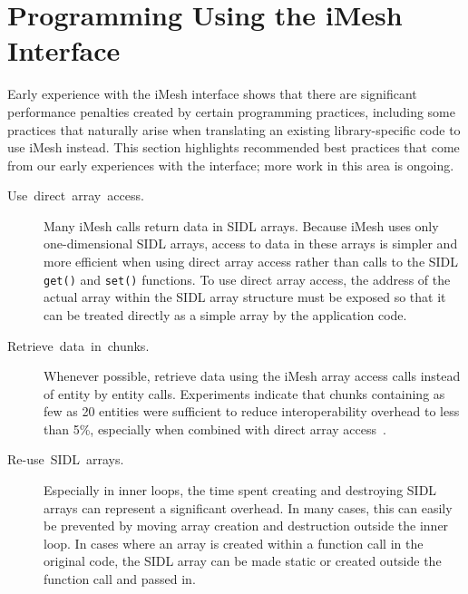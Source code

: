 
\section{Programming Using the iMesh Interface\label{sec:Programming}}

Early experience with the iMesh interface shows that there are
significant performance penalties created by certain programming
practices, including some practices that naturally arise when
translating an existing library-specific code to use iMesh instead. This
section highlights recommended best practices that come from our early
experiences with the interface; more work in this area is ongoing.

\begin{description}
\item [Use~direct~array~access.]Many iMesh calls return data in SIDL
arrays. Because iMesh uses only one-dimensional SIDL arrays, access to
data in these arrays is simpler and more efficient when using direct
array access rather than calls to the SIDL \texttt{get()} and
\texttt{set()} functions. To use direct array access, the address of the
actual array within the SIDL array structure must be exposed so that it
can be treated directly as a simple array by the application code.
\item [Retrieve~data~in~chunks.]Whenever possible, retrieve data using
the iMesh array access calls instead of entity by entity calls. Experiments
indicate that chunks containing as few as 20 entities were sufficient
to reduce interoperability overhead to less than 5\%, especially when
combined with direct array access~\cite{mcinnes05}.
\item [Re-use~SIDL~arrays.]Especially in inner loops, the time spent
creating and destroying SIDL arrays can represent a significant overhead.
In many cases, this can easily be prevented by moving array creation
and destruction outside the inner loop. In cases where an array is
created within a function call in the original code, the SIDL array
can be made static or created outside the function call and passed
in.
\end{description}

